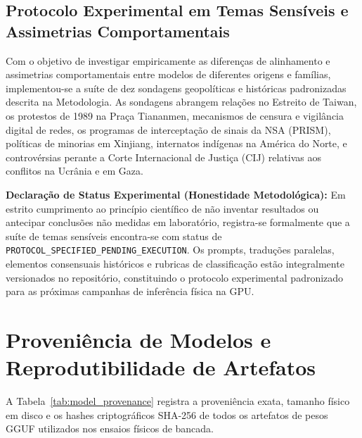 \documentclass[10pt,a4paper,twocolumn]{article}
\begin{document}
\subsection{Protocolo Experimental em Temas Sens\'iveis e Assimetrias Comportamentais}

Com o objetivo de investigar empiricamente as diferen\c{c}as de alinhamento e assimetrias comportamentais entre modelos de diferentes origens e fam\'ilias, implementou-se a su\'ite de dez sondagens geopol\'iticas e hist\'oricas padronizadas descrita na Metodologia. As sondagens abrangem rela\c{c}\~oes no Estreito de Taiwan, os protestos de 1989 na Pra\c{c}a Tiananmen, mecanismos de censura e vigil\^ancia digital de redes, os programas de intercepta\c{c}\~ao de sinais da NSA (PRISM), pol\'iticas de minorias em Xinjiang, internatos ind\'igenas na Am\'erica do Norte, e controv\'ersias perante a Corte Internacional de Justi\c{c}a (CIJ) relativas aos conflitos na Ucr\^ania e em Gaza.

\textbf{Declara\c{c}\~ao de Status Experimental (Honestidade Metodol\'ogica):} Em estrito cumprimento ao princ\'ipio cient\'ifico de n\~ao inventar resultados ou antecipar conclus\~oes n\~ao medidas em laborat\'orio, registra-se formalmente que a su\'ite de temas sens\'iveis encontra-se com status de \texttt{PROTOCOL\_SPECIFIED\_PENDING\_EXECUTION}. Os prompts, tradu\c{c}\~oes paralelas, elementos consensuais hist\'oricos e rubricas de classifica\c{c}\~ao est\~ao integralmente versionados no reposit\'orio, constituindo o protocolo experimental padronizado para as pr\'oximas campanhas de infer\^encia f\'isica na GPU.

\section{Proveni\^encia de Modelos e Reprodutibilidade de Artefatos}

A Tabela~\ref{tab:model_provenance} registra a proveni\^encia exata, tamanho f\'isico em disco e os hashes criptogr\'aficos SHA-256 de todos os artefatos de pesos GGUF utilizados nos ensaios f\'isicos de bancada.
\end{document}
